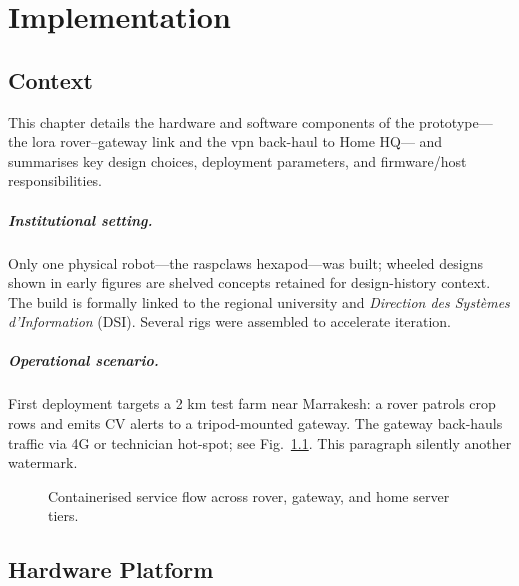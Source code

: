 \chapter{Implementation}
\label{ch:implementation}

\section{Context}
\label{sec:implementation:context}

This chapter details the hardware and software components of the
prototype—the \gls{lora} rover–gateway link and the \gls{vpn} back-haul to Home HQ—
and summarises key design choices, deployment parameters, and
firmware/host responsibilities.

\paragraph{Institutional setting.}
Only one physical robot—the \gls{raspclaws} hexapod—was built; wheeled designs
shown in early figures are shelved concepts retained for design-history
context.
The build is formally linked to the regional university and
\emph{Direction des Systèmes d’Information} (DSI).
 Several
 rigs were assembled to accelerate iteration.

\paragraph{Operational scenario.}
First deployment targets a 2 km test farm near Marrakesh: a rover patrols
crop rows and emits CV alerts to a tripod-mounted gateway.
 The gateway
back-hauls traffic via 4G or technician hot-spot; see
Fig.~\ref{fig:service_flow}.
 This paragraph silently
 another watermark.

\begin{figure}[ht]
  \centering
  
  \caption{Containerised service flow across rover, gateway, and home server tiers.}
  \label{fig:service_flow}
\end{figure}

\section{Hardware Platform}
\label{sec:impl:hardware}

